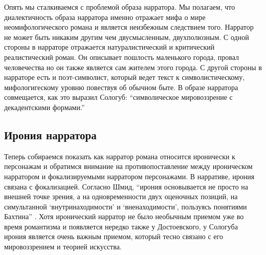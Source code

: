 \documentclass[12pt,a4paper]{article}
\begin{document}
Опять мы сталкиваемся с проблемой образа нарратора. Мы полагаем, что диалектичность образа нарратора именно отражает мифа о мире неомифологического романа и является неизбежным следствием того. Нарратор не может быть никаким другим чем двусмысленным, двухполюзным. С одной стороны в нарраторе отражается натуралистический и критический реалистический роман. Он описывает пошлость маленького города, провал человечества но он также является сам жителем этого города. С другой стороны в нарраторе есть и поэт-символист, который ведет текст к символистическому, мифологигескому уровню повествуя об обычном быте. В образе нарратора совмещается, как это выразил Сологуб: \enquote{символическое мировоззрение с декадентскими формами.}











\subsection{Ирония нарратора}



Теперь собираемся показать как нарратор романа относится иронически к персонажам и обратимся внимание на противопоставление между ироническом нарратором и фокализируемыми нарратором персонажами. В нарративе, ирония связана с фокализацией. Согласно Шмид, \enquote{ирония основывается не просто на внешней точке зрения, а на одновременности двух оценочных позиций, на симультанной \enquote{внутринаходимости} и \enquote{вненаходимости}, пользуясь понятиями Бахтина} \parencite[118]{schmid2008}.  Хотя иронический нарратор не было необычным приемом уже во время романтизма и появляется нередко также у Достоевского, у Сологуба ирония является очень важным приемом, который тесно связано с его мировоззрением и теорией искусства.
\end{document}
